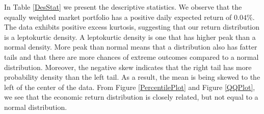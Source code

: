 In Table \ref{DesStat} we present the descriptive statistics. We observe that the equally weighted market portfolio has a positive daily expected return of $0.04\%$. The data exhibits positive excess kurtosis, suggesting that our return distribution is a leptokurtic density. A leptokurtic density is one that has higher peak than a normal density. More peak than normal means that a distribution also has fatter tails and that there are more chances of extreme outcomes compared to a normal distribution. Moreover, the negative skew indicates that the right tail has more probability density than the left tail. As a result, the mean is being skewed to the left of the center of the data. From Figure \ref{PercentilePlot} and Figure \ref{QQPlot}, we see that the economic return distribution is closely related, but not equal to a normal distribution.  

